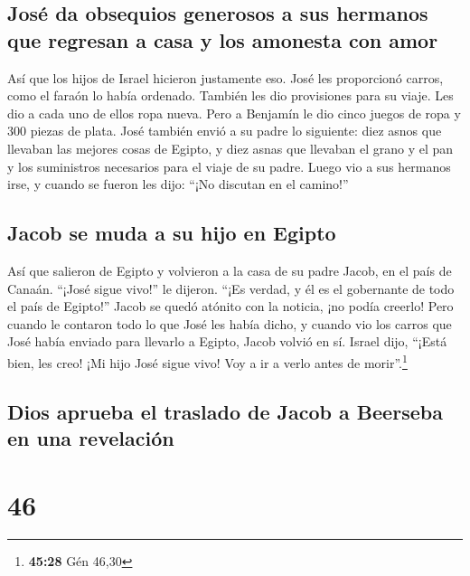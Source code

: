 \hypertarget{josuxe9-da-obsequios-generosos-a-sus-hermanos-que-regresan-a-casa-y-los-amonesta-con-amor}{%
\subsection{José da obsequios generosos a sus hermanos que regresan a
casa y los amonesta con
amor}\label{josuxe9-da-obsequios-generosos-a-sus-hermanos-que-regresan-a-casa-y-los-amonesta-con-amor}}

 Así que los hijos de Israel hicieron justamente eso.
José les proporcionó carros, como el faraón lo había ordenado. También
les dio provisiones para su viaje.  Les dio a cada uno de
ellos ropa nueva. Pero a Benjamín le dio cinco juegos de ropa y 300
piezas de plata.  José también envió a su padre lo
siguiente: diez asnos que llevaban las mejores cosas de Egipto, y diez
asnas que llevaban el grano y el pan y los suministros necesarios para
el viaje de su padre.  Luego vio a sus hermanos irse, y
cuando se fueron les dijo: ``¡No discutan en el camino!''

\hypertarget{jacob-se-muda-a-su-hijo-en-egipto}{%
\subsection{Jacob se muda a su hijo en
Egipto}\label{jacob-se-muda-a-su-hijo-en-egipto}}

 Así que salieron de Egipto y volvieron a la casa de su
padre Jacob, en el país de Canaán.  ``¡José sigue vivo!''
le dijeron. ``¡Es verdad, y él es el gobernante de todo el país de
Egipto!'' Jacob se quedó atónito con la noticia, ¡no podía creerlo!
 Pero cuando le contaron todo lo que José les había
dicho, y cuando vio los carros que José había enviado para llevarlo a
Egipto, Jacob volvió en sí.  Israel dijo, ``¡Está bien,
les creo! ¡Mi hijo José sigue vivo! Voy a ir a verlo antes de
morir''.\footnote{\textbf{45:28} Gén 46,30}

\hypertarget{dios-aprueba-el-traslado-de-jacob-a-beerseba-en-una-revelaciuxf3n}{%
\subsection{Dios aprueba el traslado de Jacob a Beerseba en una
revelación}\label{dios-aprueba-el-traslado-de-jacob-a-beerseba-en-una-revelaciuxf3n}}

\hypertarget{section-45}{%
\section{46}\label{section-45}}

